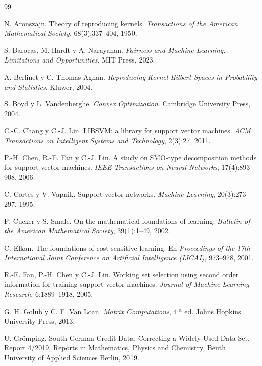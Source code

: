 \documentclass[11pt,a4paper]{article}
\theoremstyle{plain}
\theoremstyle{definition}
\theoremstyle{remark}
\numberwithin{equation}{section}
\begin{document}
\begin{thebibliography}{99}\small

 N. Aronszajn. Theory of reproducing kernels.
  \emph{Transactions of the American Mathematical Society}, 68(3):337--404, 1950.

 S. Barocas, M. Hardt y A. Narayanan.
  \emph{Fairness and Machine Learning: Limitations and Opportunities}. MIT Press, 2023.

 A. Berlinet y C. Thomas-Agnan.
  \emph{Reproducing Kernel Hilbert Spaces in Probability and Statistics}. Kluwer, 2004.

 S. Boyd y L. Vandenberghe. \emph{Convex Optimization}.
  Cambridge University Press, 2004.

 C.-C. Chang y C.-J. Lin. LIBSVM: a library for support vector machines.
  \emph{ACM Transactions on Intelligent Systems and Technology}, 2(3):27, 2011.

 P.-H. Chen, R.-E. Fan y C.-J. Lin. A study on SMO-type decomposition
  methods for support vector machines. \emph{IEEE Transactions on Neural Networks},
  17(4):893--908, 2006.

 C. Cortes y V. Vapnik. Support-vector networks.
  \emph{Machine Learning}, 20(3):273--297, 1995.

 F. Cucker y S. Smale. On the mathematical foundations of learning.
  \emph{Bulletin of the American Mathematical Society}, 39(1):1--49, 2002.

 C. Elkan. The foundations of cost-sensitive learning. En
  \emph{Proceedings of the 17th International Joint Conference on Artificial Intelligence
  (IJCAI)}, 973--978, 2001.

 R.-E. Fan, P.-H. Chen y C.-J. Lin. Working set selection using second order
  information for training support vector machines.
  \emph{Journal of Machine Learning Research}, 6:1889--1918, 2005.

 G. H. Golub y C. F. Van Loan. \emph{Matrix Computations},
  4.ª ed. Johns Hopkins University Press, 2013.

 U. Grömping. South German Credit Data: Correcting a Widely Used Data
  Set. Report 4/2019, Reports in Mathematics, Physics and Chemistry, Beuth University of
  Applied Sciences Berlin, 2019.


\end{thebibliography}
\end{document}

